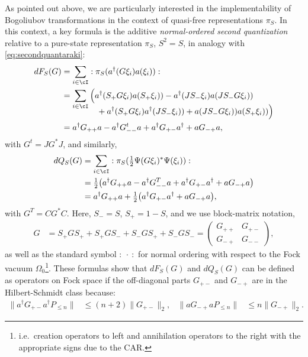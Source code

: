 \documentclass[a4paper, 11pt]{article}
\DeclareMathOperator{\1}{\mathds{1}}
\begin{document}
As pointed out above, we are particularly interested in the implementability of Bogoliubov transformations in the context of quasi-free representations $\pi_{S}$. In this context, a key formula is the additive \textit{normal-ordered second quantization} relative to a pure-state representation $\pi_{S}$, $S^{2}=S$, in analogy with \eqref{eq:secondquantaraki}:
\begin{align}
\label{eq:secondquantarakino}
dF_{S}(G) & = \sum_{i\in\cI}:\pi_{S}(a^{\dag}(G\xi_{i})a(\xi_{i})): \\ \nonumber
 & = \sum_{i\in\cI}\Big(a^{\dag}(S_{+}G\xi_{i})a(S_{+}\xi_{i})) - a^{\dag}(JS_{-}\xi_{i})a(JS_{-}G\xi_{i})) \\[-0.35cm] \nonumber
 &\hspace{1.5cm} + a^{\dag}(S_{+}G\xi_{i})a^{\dag}(JS_{-}\xi_{i}))+a(JS_{-}G\xi_{i}))a(S_{+}\xi_{i}))\Big) \\ \nonumber
 & = a^{\dag}G_{++}a - a^{\dag}G^{t}_{--}a + a^{\dag}G_{+-}a^{\dag}+aG_{-+}a,
\end{align}
with $G^{t} = JG^{*}J$, and similarly,
\begin{align}
\label{eq:secondquantarakinosdc}
dQ_{S}(G) & = \sum_{i\in\cI}:\pi_{S}(\tfrac{1}{2}\Psi(G\xi_{i})^{*}\Psi(\xi_{i})): \\ \nonumber
 & = \tfrac{1}{2}\big(a^{\dag}G_{++}a - a^{\dag}G^{T}_{--}a + a^{\dag}G_{+-}a^{\dag}+aG_{-+}a\big) \\ \nonumber
 & = a^{\dag}G_{++}a + \tfrac{1}{2}\big(a^{\dag}G_{+-}a^{\dag}+aG_{-+}a\big),
\end{align}
with $G^{T} = CG^{*}C$. Here, $S_{-} = S$, $S_{+}=1-S$, and we use block-matrix notation,
\begin{align}
\label{eq:blockmatrix}
G & = S_{+}GS_{+} + S_{+}GS_{-} + S_{-}GS_{+} + S_{-}GS_{-} = \begin{pmatrix} G_{++} & G_{+-} \\ G_{-+} & G_{--} \end{pmatrix},
\end{align}
as well as the standard symbol $:\!\ \cdot\!\ :$ for normal ordering with respect to the Fock vacuum $\Omega_{0}$\footnote{i.e.~creation operators to left and annihilation operators to the right with the appropriate signs due to the CAR.}. These formulas show that $dF_{S}(G)$ and $dQ_{S}(G) $ can be defined as operators on Fock space if the off-diagonal parts $G_{+-}$ and $G_{-+}$ are in the Hilbert-Schmidt class because:
\begin{align}
\label{eq:hilbertschmidt}
\|a^{\dag}G_{+-}a^{\dag}P_{\leq n}\| & \leq (n+2)\|G_{+-}\|_{2}, & \|aG_{-+}aP_{\leq n}\| & \leq n \|G_{-+}\|_{2}.
\end{align}
\end{document}
